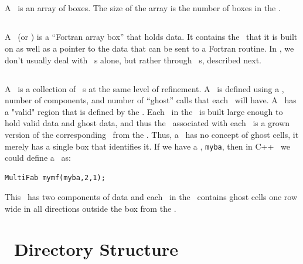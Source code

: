 \subsection{\BoxArray}

A \BoxArray\ is an array of boxes.   The size of the array is the 
number of boxes in the \BoxArray.

\subsection{\FArrayBox}

A \FArrayBox\ (or \Fab) is a ``Fortran array box'' that holds data.  It contains the
\BoxType\ that it is built on as well as a pointer to the data 
that can be sent to a Fortran routine.  In \BoxLib, we don't usually deal with 
\Fab~s alone, but rather
through \MultiFab~s, described next.

\subsection{\MultiFab}

A \MultiFab\ is a collection of \Fab~s at the same level of
refinement.  A \MultiFab\ is defined using a \BoxArray,
number of components, and number of ``ghost'' calls that each \Fab\
will have.  A \MultiFab\ has a "valid" region that is defined by 
the \BoxArray.  Each \Fab\ in the \MultiFab\ is built large enough 
to hold valid data and ghost data, and thus the \BoxType\ associated with
each \Fab\ is a grown version of the corresponding \BoxType\ from the \BoxArray.
Thus, a \Fab\ has no concept 
of ghost cells, it merely has a single box that identifies it.  
If we have a \BoxArray, {\tt myba}, then in C++ \BoxLib\ we could 
define a \MultiFab\ as:
\begin{verbatim}
MultiFab mymf(myba,2,1);
\end{verbatim}
This \MultiFab\ has two components of data and each \Fab\ in the \MultiFab\ contains 
ghost cells one row wide in all directions outside the box from the \BoxArray.



\section{\BoxLib\ Directory Structure}

